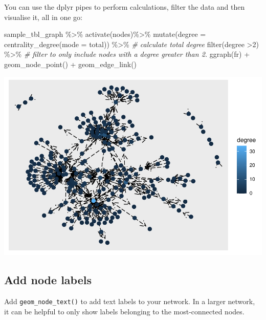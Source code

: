 \documentclass[
]{book}
\newenvironment{Shaded}{\begin{snugshade}}{\end{snugshade}}
\newcommand{\AttributeTok}[1]{\textcolor[rgb]{0.77,0.63,0.00}{#1}}
\newcommand{\CommentTok}[1]{\textcolor[rgb]{0.56,0.35,0.01}{\textit{#1}}}
\newcommand{\DecValTok}[1]{\textcolor[rgb]{0.00,0.00,0.81}{#1}}
\newcommand{\FunctionTok}[1]{\textcolor[rgb]{0.00,0.00,0.00}{#1}}
\newcommand{\NormalTok}[1]{#1}
\newcommand{\SpecialCharTok}[1]{\textcolor[rgb]{0.00,0.00,0.00}{#1}}
\newcommand{\StringTok}[1]{\textcolor[rgb]{0.31,0.60,0.02}{#1}}
\begin{document}
You can use the dplyr pipes to perform calculations, filter the data and then visualise it, all in one go:

\begin{Shaded}
\begin{Highlighting}[]
\NormalTok{sample\_tbl\_graph }\SpecialCharTok{\%\textgreater{}\%} 
  \FunctionTok{activate}\NormalTok{(nodes)}\SpecialCharTok{\%\textgreater{}\%} 
  \FunctionTok{mutate}\NormalTok{(}\AttributeTok{degree =} \FunctionTok{centrality\_degree}\NormalTok{(}\AttributeTok{mode =} \StringTok{\textquotesingle{}total\textquotesingle{}}\NormalTok{)) }\SpecialCharTok{\%\textgreater{}\%} \CommentTok{\# calculate total degree }
  \FunctionTok{filter}\NormalTok{(degree }\SpecialCharTok{\textgreater{}}\DecValTok{2}\NormalTok{) }\SpecialCharTok{\%\textgreater{}\%} \CommentTok{\# filter to only include nodes with a degree greater than 2.}
  \FunctionTok{ggraph}\NormalTok{(}\StringTok{\textquotesingle{}fr\textquotesingle{}}\NormalTok{) }\SpecialCharTok{+} 
  \FunctionTok{geom\_node\_point}\NormalTok{() }\SpecialCharTok{+} 
  \FunctionTok{geom\_edge\_link}\NormalTok{()}
\end{Highlighting}
\end{Shaded}

\includegraphics{_main_files/figure-latex/unnamed-chunk-63-1.pdf}

\hypertarget{add-node-labels}{%
\subsection{Add node labels}\label{add-node-labels}}

Add \texttt{geom\_node\_text()} to add text labels to your network. In a larger network, it can be helpful to only show labels belonging to the most-connected nodes.
\end{document}
